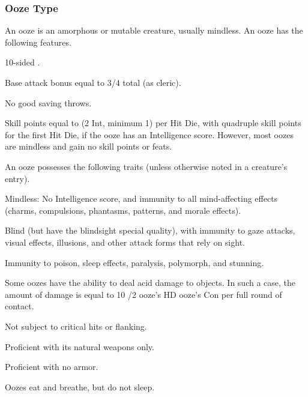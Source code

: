 \subsubsection{Ooze Type} An ooze is an amorphous or mutable creature, usually mindless.
 An ooze has the following features.
\begin{itemize*}
\item 10-sided .
\item Base attack bonus equal to 3/4 total  (as cleric).
\item No good saving throws.
\item Skill points equal to (2 \add Int, minimum 1) per Hit Die, with quadruple skill points for the first Hit Die, if the ooze has an Intelligence score. However, most oozes are mindless and gain no skill points or feats.
\end{itemize*}
 An ooze possesses the following traits (unless otherwise noted in a creature's entry).
\begin{itemize*}
\item Mindless: No Intelligence score, and immunity to all mind-affecting effects (charms, compulsions, phantasms, patterns, and morale effects).
\item Blind (but have the blindsight special quality), with immunity to gaze attacks, visual effects, illusions, and other attack forms that rely on sight.
\item Immunity to poison, sleep effects, paralysis, polymorph, and stunning.
\item Some oozes have the ability to deal acid damage to objects. In such a case, the amount of damage is equal to 10 /2 ooze's HD \add ooze's Con per full round of contact.
\item Not subject to critical hits or flanking.
\item Proficient with its natural weapons only.
\item Proficient with no armor.
\item Oozes eat and breathe, but do not sleep.
\end{itemize*}

